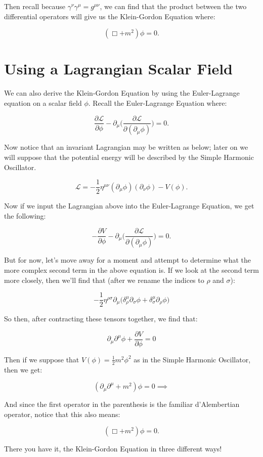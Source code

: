\documentclass[parskip=full]{article}
\begin{document}
Then recall because $\gamma^{\nu}\gamma^{\mu} = g^{\mu\nu}$, we can find that the product between the two differential operators will give us the Klein-Gordon Equation where:

\[
    (\Box + m^2)\phi = 0
.\]

\section{Using a Lagrangian Scalar Field}
We can also derive the Klein-Gordon Equation by using the Euler-Lagrange equation on a scalar field $\phi$. Recall the Euler-Lagrange Equation where:

\[
    \frac{\partial\mathcal{L}}{\partial \phi} - \partial_{\mu} \Bigg( \frac{\partial\mathcal{L}}{\partial(\partial_{\mu}\phi)}  \Bigg) = 0 
.\] 

Now notice that an invariant Lagrangian may be written as below; later on we will suppose that the potential energy will be described by the Simple Harmonic Oscillator.

\[
    \mathcal{L} = - \frac{1}{2} \eta^{\mu\nu} (\partial_{\mu}\phi)(\partial_{\nu}\phi) - V(\phi) 
.\] 

Now if we input the Lagrangian above into the Euler-Lagrange Equation, we get the following:

\[
    - \frac{\partial V}{\partial \phi} - \partial_{\mu} \Bigg(\frac{\partial\mathcal{L}}{\partial(\partial_{\mu}\phi)}\Bigg) = 0
.\] 

But for now, let's move away for a moment and attempt to determine what the more complex second term in the above equation is. If we look at the second term more closely, then we'll find that (after we rename the indices to $\rho$ and $\sigma$):

\[
    - \frac{1}{2} \eta^{\rho\sigma} \partial_{\mu} \Bigg(\delta^{\mu}_{\rho}\partial_{\sigma}\phi + \delta^{\mu}_{\sigma} \partial_{\rho}\phi \Bigg)
\] 

So then, after contracting these tensors together, we find that:

\[
    \partial_{\mu} \partial^{\mu}\phi + \frac{\partial V}{\partial \phi} = 0 
\] 

Then if we suppose that $V(\phi) = \frac{1}{2} m^2 \phi^2$ as in the Simple Harmonic Oscillator, then we get:

\[
    (\partial_{\mu} \partial^{\mu} + m^2)\phi = 0 \implies
\] 

And since the first operator in the parenthesis is the familiar d'Alembertian operator, notice that this also means:

\[
    (\Box + m^2)\phi = 0
.\] 

There you have it, the Klein-Gordon Equation in three different ways!
\end{document}
